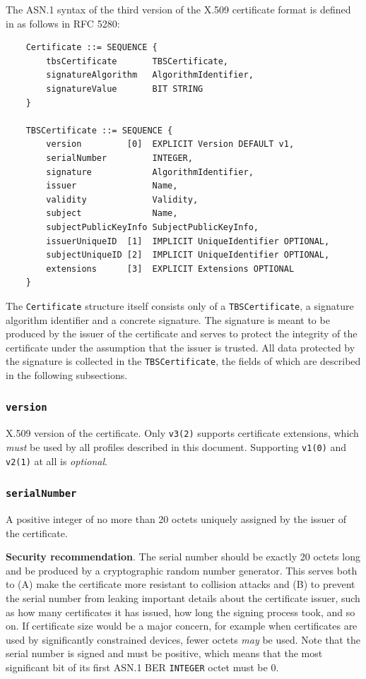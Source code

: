 The ASN.1 syntax of the third version of the X.509 certificate format is defined in as follows in RFC 5280:

\begin{verbatim}
    Certificate ::= SEQUENCE {
        tbsCertificate       TBSCertificate,
        signatureAlgorithm   AlgorithmIdentifier,
        signatureValue       BIT STRING
    }

    TBSCertificate ::= SEQUENCE {
        version         [0]  EXPLICIT Version DEFAULT v1,
        serialNumber         INTEGER,
        signature            AlgorithmIdentifier,
        issuer               Name,
        validity             Validity,
        subject              Name,
        subjectPublicKeyInfo SubjectPublicKeyInfo,
        issuerUniqueID  [1]  IMPLICIT UniqueIdentifier OPTIONAL,
        subjectUniqueID [2]  IMPLICIT UniqueIdentifier OPTIONAL,
        extensions      [3]  EXPLICIT Extensions OPTIONAL
    }
\end{verbatim}

The \texttt{Certificate} structure itself consists only of a \texttt{TBSCertificate}, a signature algorithm identifier and a concrete signature.
The signature is meant to be produced by the issuer of the certificate and serves to protect the integrity of the certificate under the assumption that the issuer is trusted.
All data protected by the signature is collected in the \texttt{TBSCertificate}, the fields of which are described in the following subsections.

\subsubsection{\texttt{version}}

X.509 version of the certificate.
Only \texttt{v3(2)} supports certificate extensions, which \textit{must} be used by all profiles described in this document.
Supporting \texttt{v1(0)} and \texttt{v2(1)} at all is \textit{optional}.

\subsubsection{\texttt{serialNumber}}

A positive integer of no more than 20 octets uniquely assigned by the issuer of the certificate.

\textbf{Security recommendation}.
The serial number should be exactly 20 octets long and be produced by a cryptographic random number generator.
This serves both to (A) make the certificate more resistant to collision attacks and (B) to prevent the serial number from leaking important details about the certificate issuer, such as how many certificates it has issued, how long the signing process took, and so on.
If certificate size would be a major concern, for example when certificates are used by significantly constrained devices, fewer octets \textit{may} be used.
Note that the serial number is signed and must be positive, which means that the most significant bit of its first ASN.1 BER \texttt{INTEGER} octet must be 0.

